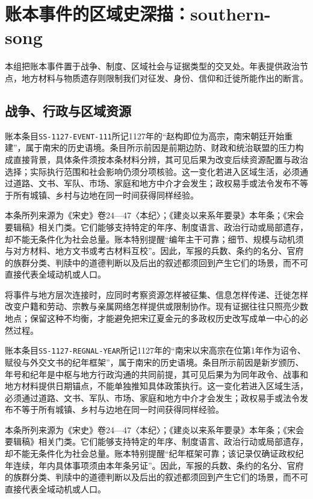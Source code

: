 \section{账本事件的区域史深描：southern-song}

\label{sec:ledger-depth-southern-song}

本组把账本事件置于战争、制度、区域社会与证据类型的交叉处。年表提供政治节点，地方材料与物质遗存则限制我们对征发、身份、信仰和迁徙所能作出的断言。

\subsection{战争、行政与区域资源}

账本条目\texttt{SS-1127-EVENT-111}所记1127年的“赵构即位为高宗，南宋朝廷开始重建”，属于南宋的历史语境。条目所示前因是前期边防、财政和统治联盟的压力构成直接背景，具体条件须按本条材料分辨，其可见后果为改变后续资源配置与政治选择；实际执行范围和社会影响仍须分项核验。这一变化若进入区域生活，必须通过道路、文书、军队、市场、家庭和地方中介才会发生；政权易手或法令发布不等于所有城镇、乡村与边地在同一时间获得同样经验。

本条所列来源为《宋史》卷24—47〈本纪〉；《建炎以来系年要录》本年条；《宋会要辑稿》相关门类。它们能够支持特定的年序、制度语言、政治行动或局部遗存，却不能无条件化为社会总量。账本特别提醒“编年主干可靠；细节、规模与动机须与对方材料、地方文书或考古材料互校”。因此，军报的兵数、条约的名分、官府的族群分类、判牍中的道德判断以及后出的叙述都须回到产生它们的场景，而不可直接代表全域动机或人口。

将事件与地方层次连接时，应同时考察资源怎样被征集、信息怎样传递、迁徙怎样改变户籍和劳动、宗教与亲属网络怎样提供或限制协作。现有证据往往只照亮少数地点；保留这种不均衡，才能避免把宋辽夏金元的多政权历史改写成单一中心的必然过程。

账本条目\texttt{SS-1127-REGNAL-YEAR}所记1127年的“南宋以宋高宗在位第1年作为诏令、赋役与外交文书的纪年框架”，属于南宋的历史语境。条目所示前因是新岁颁历、年号和纪年是中枢与地方行政沟通的共同前提，其可见后果为为同年政令、战事和地方材料提供日期锚点，不能单独推知具体政策执行。这一变化若进入区域生活，必须通过道路、文书、军队、市场、家庭和地方中介才会发生；政权易手或法令发布不等于所有城镇、乡村与边地在同一时间获得同样经验。

本条所列来源为《宋史》卷24—47〈本纪〉；《建炎以来系年要录》本年条；《宋会要辑稿》相关门类。它们能够支持特定的年序、制度语言、政治行动或局部遗存，却不能无条件化为社会总量。账本特别提醒“纪年框架可靠；该记录仅确证政权纪年连续，年内具体事项须由本年条另证”。因此，军报的兵数、条约的名分、官府的族群分类、判牍中的道德判断以及后出的叙述都须回到产生它们的场景，而不可直接代表全域动机或人口。

